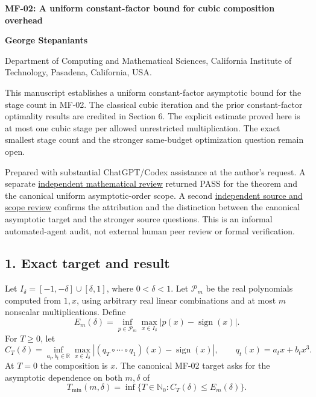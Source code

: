 \documentclass[10pt,a4paper]{article}
\begin{document}
{\raggedright\Large\bfseries MF-02: A uniform constant-factor bound for
cubic composition overhead\par}
\vspace{0.4em}
{\normalsize\bfseries George Stepaniants\par}
{\small Department of Computing and Mathematical Sciences, California
Institute of Technology, Pasadena, California, USA.\par}
\vspace{0.6em}
\pagestyle{plain}
\setlength{\abovedisplayskip}{6pt}
\setlength{\belowdisplayskip}{6pt}
\setlength{\abovedisplayshortskip}{4pt}
\setlength{\belowdisplayshortskip}{4pt}

This manuscript establishes a uniform constant-factor asymptotic bound
for the stage count in MF-02. The classical cubic iteration and the
prior constant-factor optimality results are credited in Section 6. The
explicit estimate proved here is at most one cubic stage per allowed
unrestricted multiplication. The exact smallest stage count and the
stronger same-budget optimization question remain open.

Prepared with substantial ChatGPT/Codex assistance at the author's
request. A separate
\href{https://github.com/ajt60gaibb/OpenProblemsInNLA/blob/main/references/stepaniants-mf02-2026-09-12/verification/independent-review/MF-02-independent-review.md}{independent
mathematical review} returned PASS for the theorem and the canonical
uniform asymptotic-order scope. A second
\href{https://github.com/ajt60gaibb/OpenProblemsInNLA/blob/main/references/stepaniants-mf02-2026-09-12/verification/source-review/REVIEW.md}{independent
source and scope review} confirms the attribution and the distinction
between the canonical asymptotic target and the stronger source
questions. This is an informal automated-agent audit, not external human
peer review or formal verification.

\subsection{1. Exact target and result}\label{exact-target-and-result}

Let \(I_\delta=[-1,-\delta]\cup[\delta,1]\), where \(0<\delta<1\). Let
\(\mathcal P_m\) be the real polynomials computed from \(1,x\), using
arbitrary real linear combinations and at most \(m\) nonscalar
multiplications. Define \[
E_m(\delta)=\inf_{p\in\mathcal P_m}
 \max_{x\in I_\delta}|p(x)-\operatorname{sign}(x)|.
\] For \(T\ge0\), let \[
C_T(\delta)=\inf_{a_t,b_t\in\mathbb R}
 \max_{x\in I_\delta}
 |(q_T\circ\cdots\circ q_1)(x)-\operatorname{sign}(x)|,
\qquad q_t(x)=a_tx+b_tx^3.
\] At \(T=0\) the composition is \(x\). The canonical MF-02 target asks
for the asymptotic dependence on both \(m,\delta\) of \[
T_{\min}(m,\delta)=
\inf\{T\in\mathbb N_0:C_T(\delta)\le E_m(\delta)\}.
\]
\end{document}
